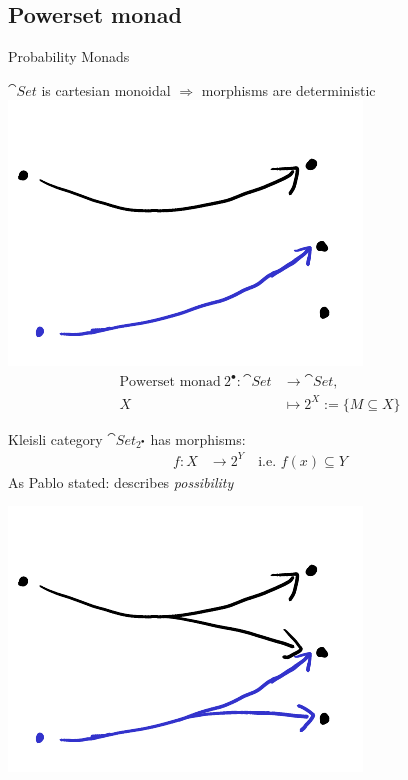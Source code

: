 \subsection{Powerset monad}

\begin{frame}{Probability Monads}
	\begin{example}
		$\cat{Set}$ is cartesian monoidal $\Rightarrow$ morphisms are deterministic
		\includegraphics[scale=0.4]{part2/Figures/morphisms_set}
		\begin{equation*}
		\begin{split}
		\text{Powerset monad} ~
		2^{\bullet} : \cat{Set} &\to \cat{Set}, \quad \\
		X &\mapsto 2^X := \{ M \subseteq X \}
		\end{split}
		\end{equation*}
		\begin{minipage}{0.69\linewidth}
			Kleisli category $\cat{Set}_{2^{\bullet}}$ has morphisms: 
			\begin{equation*}
			\begin{split}
				f : X &\to 2^Y	
				\quad \text{i.e.~}
				f(x) \subseteq Y
			\end{split}
			\end{equation*}
			As Pablo stated: describes \emph{possibility}
	\end{minipage}
	\begin{minipage}{0.3\linewidth}
		\includegraphics[scale=0.4]{part2/Figures/morphisms_poss}
	\end{minipage}
	\end{example}
\end{frame}

